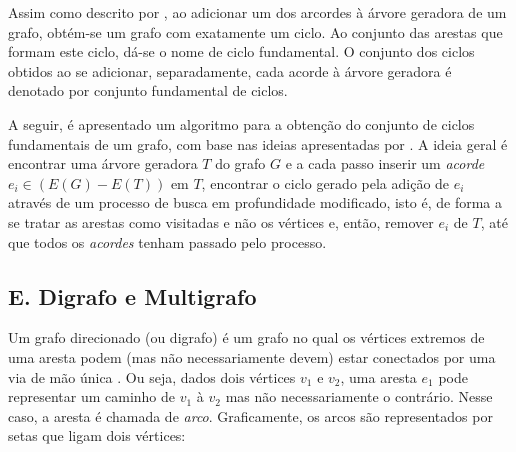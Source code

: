 \documentclass[twocolumn, 10pt]{extarticle}
\begin{document}
Assim como descrito por \cite{krishna}, ao adicionar um dos arcordes à árvore geradora de um grafo, obtém-se um grafo com exatamente um ciclo. Ao conjunto das arestas que formam este ciclo, dá-se o nome de ciclo fundamental. O conjunto dos ciclos obtidos ao se adicionar, separadamente, cada acorde à árvore geradora é denotado por conjunto fundamental de ciclos. 

A seguir, é apresentado um algoritmo para a obtenção do conjunto de ciclos fundamentais de um grafo, com base nas ideias apresentadas por \cite{krishna}. A ideia geral é encontrar uma árvore geradora $T$ do grafo $G$ e a cada passo inserir um \textit{acorde} $e_i \in (E(G)-E(T))$ em $T$, encontrar o ciclo gerado pela adição de $e_i$ através de um processo de busca em profundidade modificado, isto é, de forma a se tratar as arestas como visitadas e não os vértices e, então, remover $e_i$ de $T$, até que todos os \textit{acordes} tenham passado pelo processo.

\begingroup
{}\label{lp}
\begin{algorithmic}[1]
	\EndFor
\EndFunction
\end{algorithmic}
\hrulefill
\endgroup

\subsection*{E. \quad Digrafo e Multigrafo}

Um grafo direcionado (ou digrafo) é um grafo no qual os vértices extremos de uma aresta podem (mas não necessariamente devem) estar conectados por uma via de mão única \cite[p. 566]{sedgewick}. Ou seja, dados dois vértices $v_1$ e $v_2$, uma aresta $e_1$ pode representar um caminho de $v_1$ à $v_2$ mas não necessariamente o contrário. Nesse caso, a aresta é chamada de \textit{arco}. Graficamente, os arcos são representados por setas que ligam dois vértices:
\end{document}
